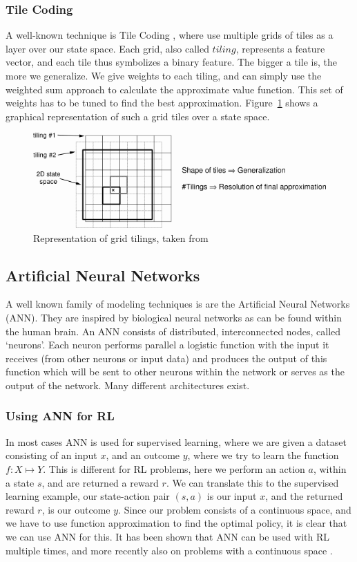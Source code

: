 \documentclass[a4paper,12pt]{article}
\begin{document}
\subsubsection{Tile Coding}
A well-known technique is Tile Coding \cite{sutton1998rl}, where use multiple grids of tiles as a layer over our state space. Each grid, also called $tiling$, represents a feature vector, and each tile thus symbolizes a binary feature. The bigger a tile is, the more we generalize. We give weights to each tiling, and can simply use the weighted sum approach to calculate the approximate value function. This set of weights has to be tuned to find the best approximation. Figure~\ref{fig:figtmp54} shows a graphical representation of such a grid tiles over a state space.
\begin{figure}[H]
\centering
\includegraphics[width=\textwidth]{img/figtmp54}
\caption{Representation of grid tilings, taken from \cite{sutton1998rl}}
\label{fig:figtmp54}
\end{figure}

\subsection{Artificial Neural Networks}
A well known family of modeling techniques is are the Artificial Neural Networks (ANN). They are inspired by biological neural networks as can be found within the human brain. An ANN consists of distributed, interconnected nodes, called `neurons'. Each neuron performs parallel a logistic function with the input it receives (from other neurons or input data) and produces the output of this function which will be sent to other neurons within the network or serves as the output of the network. Many different architectures exist. 

\subsubsection{Using ANN for RL}
In most cases ANN is used for supervised learning, where we are given a dataset consisting of an input $x$, and an outcome $y$, where we try to learn the function $f:X \mapsto Y$. This is different for RL problems, here we perform an action $a$, within a state $s$, and are returned a reward $r$. We can translate this to the supervised learning example, our state-action pair $(s,a)$ is our input $x$, and the returned reward $r$, is our outcome $y$. Since our problem consists of a continuous space, and we have to use function approximation to find the optimal policy, it is clear that we can use ANN for this. It has been shown that ANN can be used with RL \cite{dominic1991ann,hoskins1992ann} multiple times, and more recently also on problems with a continuous space \cite{wang2005ann}.
\end{document}

